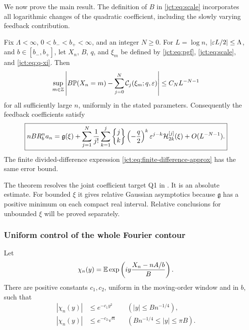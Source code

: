 We now prove the main result. The definition of $B$ in
\eqref{jct:eq:scale} incorporates all logarithmic changes of the quadratic
coefficient, including the slowly varying feedback contribution.

\begin{theorem}
\label{jct:thm:all-orders}
Fix $\Lambda<\infty$, $0<b_-<b_+<\infty$, and an integer $N\ge0$.
For $L=\log n$, $|\varepsilon L/2|\le\Lambda$, and $b\in[b_-,b_+]$,
let $X_n$, $B$, $q$, and $\xi_m$ be defined by
\eqref{jct:eq:pgf}, \eqref{jct:eq:scale}, and \eqref{jct:eq:q-xi}. Then
\begin{equation}\label{jct:eq:uniform-lattice}
 \sup_{m\in\mathbb Z}\left|
 B\mathbb{P}(X_n=m)-\sum_{j=0}^N\mathcal C_j(\xi_m;q,\varepsilon)
 \right|\le C_N L^{-N-1}
\end{equation}
for all sufficiently large $n$, uniformly in the stated parameters.
Consequently the feedback coefficients satisfy
\begin{equation}\label{jct:eq:all-orders-coefficient}
 \boxed{\displaystyle
 nB R_b^n a_n
 =\mathfrak{g}(\xi)+
  \sum_{j=1}^N\frac1{j!}\sum_{k=1}^j
    \left\{\begin{matrix}j\\k\end{matrix}\right\}\left(-\frac q2\right)^k\varepsilon^{j-k}
           \mathcal{H}_{2k}^{[j]}(\xi)
       +O(L^{-N-1}).}
\end{equation}
The finite divided-difference expression
\eqref{jct:eq:finite-difference-approx} has the same error bound.
\end{theorem}

The theorem resolves the joint coefficient target Q1 in
\cite{qfb:reports}. It is an absolute estimate. For bounded $\xi$
it gives relative Gaussian asymptotics because $\mathfrak{g}$ has a
positive minimum on each compact real interval. Relative conclusions
for unbounded $\xi$ will be proved separately.

\subsubsection{Uniform control of the whole Fourier contour}

\begin{lemma}
\label{jct:lem:fourier-tail}
Let
\begin{equation}\label{jct:eq:chi}
 \chi_n(y)=\mathbb E\exp\left(iy\frac{X_n-nA/b}{B}\right).
\end{equation}
There are positive constants $c_1,c_2$, uniform in the moving-order
window and in $b$, such that
\begin{align}
 |\chi_n(y)|&\le e^{-c_1y^2}
       &&(|y|\le Bn^{-1/4}),\label{jct:eq:fourier-small}\\
 |\chi_n(y)|&\le e^{-c_2\sqrt n}
       &&(Bn^{-1/4}\le |y|\le\pi B).
       \label{jct:eq:fourier-large}
\end{align}
\end{lemma}

